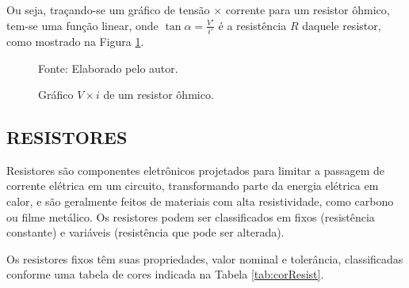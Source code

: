 \documentclass[12pt]{article}
\begin{document}
    Ou seja, traçando-se um gráfico de tensão $\times$ corrente para um resistor ôhmico, tem-se uma função linear, onde $\tan{\alpha}=\frac{V'}{i'}$ é a resistência $R$ daquele resistor, como mostrado na Figura \ref{fig:resistorohmico}.
        \begin{figure}[h!]
            \centering
            \begin{minipage}{0.5\textwidth}
                \centering
                \caption{Gráfico $V\times i$ de um resistor ôhmico.}

                \raggedright \footnotesize Fonte: Elaborado pelo autor.
                \label{fig:resistorohmico}
            \end{minipage}
        \end{figure}
    
    \subsection{RESISTORES}\indent

    Resistores são componentes eletrônicos projetados para limitar a passagem de corrente elétrica em um circuito, transformando parte da energia elétrica em calor, e são geralmente feitos de materiais com alta resistividade, como carbono ou filme metálico. Os resistores podem ser classificados em fixos (resistência constante) e variáveis (resistência que pode ser alterada).

    Os resistores fixos têm suas propriedades, valor nominal e tolerância, classificadas conforme uma tabela de cores indicada na Tabela \ref{tab:corResist}.
    
\end{document}

